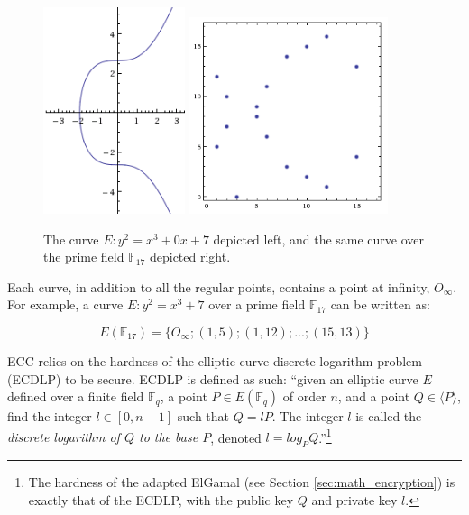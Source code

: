 \begin{figure}[htb]
	\centering
	\includegraphics[width=0.37\textwidth]{introduction/secp256k1-graph}
	\includegraphics[width=0.52\textwidth]{introduction/secp256k1-graph-over-field-p17}
	\caption{The curve \(E: y^2 = x^3 + 0x + 7\) depicted left, and the same curve over the prime field
		\(\mathbb{F}_{17}\) depicted right.}
	\label{fig:graphs}
\end{figure}

Each curve, in addition to all the regular points, contains a point at infinity, \(O_\infty\). For example, a
curve \(E: y^2 = x^3 + 7\) over a prime field \(\mathbb{F}_{17}\) can be written as:

\begin{equation}
	E(\mathbb{F}_{17}) = \{ O_\infty; (1,5); (1,12); ...; (15,13) \}
\end{equation}

ECC relies on the hardness of the elliptic curve discrete logarithm problem (ECDLP) to be secure. ECDLP is
defined as such: ``given an elliptic curve \(E\) defined over a finite field \(\mathbb{F}_q\), a point
\(P \in E(\mathbb{F}_q)\) of order \(n\), and a point \(Q \in \langle P \rangle\), find the integer
\(l \in [0,n-1]\) such that \(Q = lP\). The integer \(l\) is called the \emph{discrete logarithm of
\(Q\) to the base \(P\)}, denoted \(l = log_P Q\).''\footnote{The hardness of the adapted ElGamal (see
Section \ref{sec:math_encryption}) is exactly that of the ECDLP, with the public key \(Q\) and private
key \(l\).}\cite{hankerson2010}

